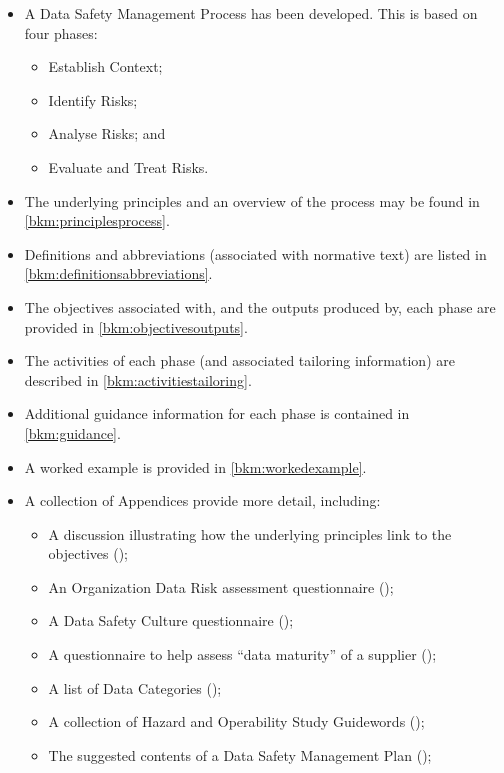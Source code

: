\begin{itemize}
  \item A Data Safety Management Process has been developed. This is based on four phases:
    \begin{itemize}
      \item Establish Context;
      \item Identify Risks;
      \item Analyse Risks; and
      \item Evaluate and Treat Risks.
    \end{itemize}
	\item The underlying principles and an overview of the process may be found in \autoref{bkm:principlesprocess}.
	\item Definitions and abbreviations (associated with normative text) are listed in \autoref{bkm:definitionsabbreviations}.
	\item The objectives associated with, and the outputs produced by, each phase are provided in \autoref{bkm:objectivesoutputs}.
	\item The activities of each phase (and associated tailoring information) are described in \autoref{bkm:activitiestailoring}.
	\item Additional guidance information for each phase is contained in \autoref{bkm:guidance}.
  \item A worked example is provided in \autoref{bkm:workedexample}.
  \item A collection of Appendices provide more detail, including:
    \begin{itemize}
      \item A discussion illustrating how the underlying principles link to the objectives (); 
      \item An Organization Data Risk assessment questionnaire ();
      \item A Data Safety Culture questionnaire ();
      \item A questionnaire to help assess ``data maturity'' of a supplier ();
      \item A list of Data Categories ();
      \item A collection of Hazard and Operability Study Guidewords ();
      \item The suggested contents of a Data Safety Management Plan ();

\end{itemize}
\end{itemize}
